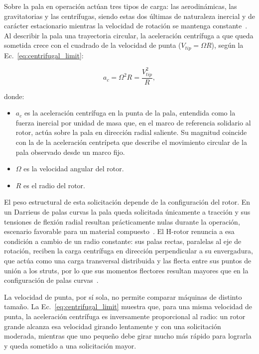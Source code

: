 Sobre la pala en operación actúan tres tipos de carga: las aerodinámicas, las gravitatorias y las centrífugas, siendo estas dos últimas de naturaleza inercial y de carácter estacionario mientras la velocidad de rotación se mantenga constante~\parencite{Galinos2015}. Al describir la pala una trayectoria circular, la aceleración centrífuga a que queda sometida crece con el cuadrado de la velocidad de punta ($V_{tip} = \Omega R$), según la Ec.~\ref{eq:centrifugal_limit}:

\begin{equation}
    a_c = \Omega^2 R = \frac{V_{tip}^2}{R},
    \label{eq:centrifugal_limit}
\end{equation}

donde:
\begin{itemize}
    \item $a_c$ es la aceleración centrífuga en la punta de la pala, entendida como la fuerza inercial por unidad de masa que, en el marco de referencia solidario al rotor, actúa sobre la pala en dirección radial saliente. Su magnitud coincide con la de la aceleración centrípeta que describe el movimiento circular de la pala observado desde un marco fijo.
    \item $\Omega$ es la velocidad angular del rotor.
    \item $R$ es el radio del rotor.
\end{itemize}

El peso estructural de esta solicitación depende de la configuración del rotor. En un Darrieus de palas curvas la pala queda solicitada únicamente a tracción y sus tensiones de flexión radial resultan prácticamente nulas durante la operación, escenario favorable para un material compuesto~\parencite{Sutherland2012}. El H-rotor renuncia a esa condición a cambio de un radio constante: sus palas rectas, paralelas al eje de rotación, reciben la carga centrífuga en dirección perpendicular a su envergadura, que actúa como una carga transversal distribuida y las flecta entre sus puntos de unión a los struts, por lo que sus momentos flectores resultan mayores que en la configuración de palas curvas~\parencite{Mollerstrom2019}.

La velocidad de punta, por sí sola, no permite comparar máquinas de distinto tamaño. La Ec.~\ref{eq:centrifugal_limit} muestra que, para una misma velocidad de punta, la aceleración centrífuga es inversamente proporcional al radio: un rotor grande alcanza esa velocidad girando lentamente y con una solicitación moderada, mientras que uno pequeño debe girar mucho más rápido para lograrla y queda sometido a una solicitación mayor.


